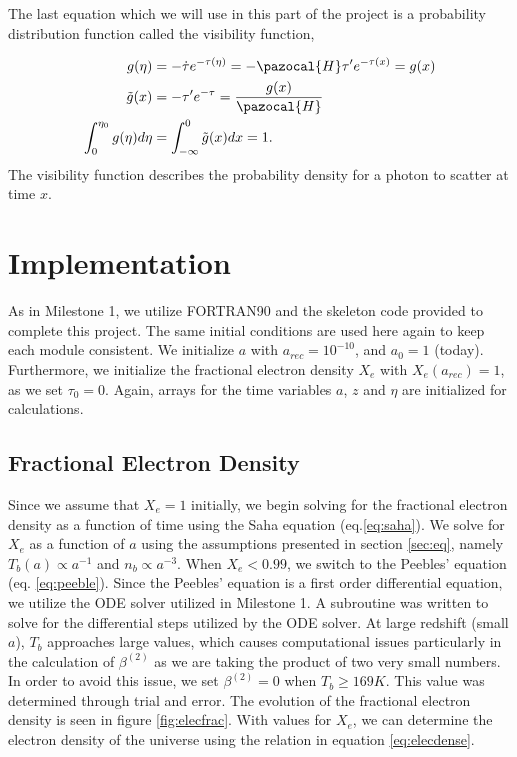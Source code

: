 \documentclass[twoside]{article}
\begin{document}
The last equation which we will use in this part of the project is a probability distribution function called the visibility function,

\begin{align}\label{eq:vis}
g(\eta) &= -\dot{\tau}e^{-\tau(\eta)} = -\pazocal{H}\tau'e^{-\tau(x)} = g(x)\\
\tilde{g}(x) &= -\tau'e^{-\tau} = \dfrac{g(x)}{\pazocal{H}}\\ 
\int_0^{\eta_0}g(\eta)d\eta &= \int_{-\infty}^0 \tilde{g}(x)dx = 1.
\end{align}
The visibility function describes the probability density for a photon to scatter at time $x$. 

\clearpage

\section{Implementation}\label{sec:imp}

As in Milestone 1, we utilize FORTRAN90 and the skeleton code provided to complete this project. The same initial conditions are used here again to keep each module consistent. We initialize $a$ with $a_{rec} = 10^{-10}$, and $a_0 = 1$ (today). Furthermore, we initialize the fractional electron density $X_e$ with $X_e(a_{rec}) = 1$, as we set $\tau_0 = 0.$ Again, arrays for the time variables $a$, $z$ and $\eta$ are initialized for calculations.

\subsection{Fractional Electron Density}\label{sec:fraccalc}
Since we assume that $X_e = 1$ initially, we begin solving for the fractional electron density as a function of time using the Saha equation (eq.\ref{eq:saha}). We solve for $X_e$ as a function of $a$ using the assumptions presented in section \ref{sec:eq}, namely $T_b(a) \propto a^{-1}$ and $n_b \propto a^{-3}$. When $X_e < 0.99$, we switch to the Peebles' equation (eq. \ref{eq:peeble}). Since the Peebles' equation is a first order differential equation, we utilize the ODE solver utilized in Milestone 1. A subroutine was written to solve for the differential steps utilized by the ODE solver. At large redshift (small $a$), $T_b$ approaches large values, which causes computational issues particularly in the calculation of $\beta^{(2)}$ as we are taking the product of two very small numbers. In order to avoid this issue, we set $\beta^{(2)} = 0$ when $T_b \geq 169K$. This value was determined through trial and error. The evolution of the fractional electron density is seen in figure \ref{fig:elecfrac}. With values for $X_e$, we can determine the electron density of the universe using the relation in equation \ref{eq:elecdense}.\\
\end{document}
